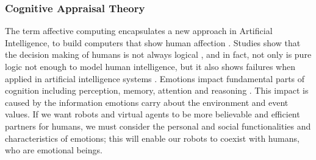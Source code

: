 \documentclass[a4paper, 11pt]{article}
\begin{document}
\begin{small}


\vspace*{-4mm}
\subsubsection*{Cognitive Appraisal Theory}

The term affective computing encapsulates a new approach in Artificial
Intelligence, to build computers that show human affection
\cite{picard:affective-computing}. Studies show that the decision making of
humans is not always logical \cite{GrossbergGutowski:affect-cognition}, and in
fact, not only is pure logic not enough to model human intelligence, but it also
shows failures when applied in artificial intelligence systems
\cite{dreyfus:artificial-critique}. Emotions impact fundamental parts of
cognition including perception, memory, attention and reasoning
\cite{clore:judgement-regulation}. This impact is caused by the information
emotions carry about the environment and event values. If we want robots and
virtual agents to be more believable and efficient partners for humans, we must
consider the personal and social functionalities and characteristics of
emotions; this will enable our robots to coexist with humans, who are emotional
beings.


\end{small}
\end{document}
